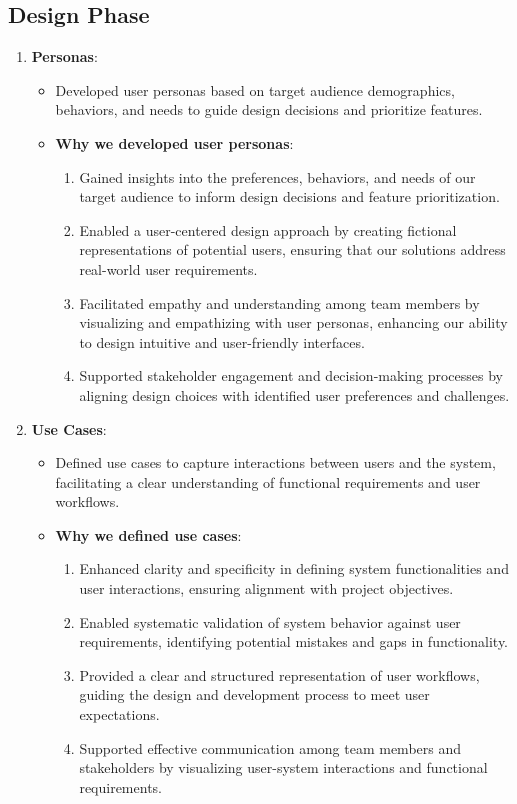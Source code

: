 \subsection{Design Phase}

\begin{enumerate}
    \item \textbf{Personas}:
    \begin{itemize}
        \item Developed user personas based on target audience demographics, behaviors, and needs to guide design decisions and prioritize features.
        \item \textbf{Why we developed user personas}:
            \begin{enumerate}
                \item Gained insights into the preferences, behaviors, and needs of our target audience to inform design decisions and feature prioritization.
                \item Enabled a user-centered design approach by creating fictional representations of potential users, ensuring that our solutions address real-world user requirements.
                \item Facilitated empathy and understanding among team members by visualizing and empathizing with user personas, enhancing our ability to design intuitive and user-friendly interfaces.
                \item Supported stakeholder engagement and decision-making processes by aligning design choices with identified user preferences and challenges.
            \end{enumerate}
    \end{itemize}

    
    \item \textbf{Use Cases}:
    \begin{itemize}
        \item Defined use cases to capture interactions between users and the system, facilitating a clear understanding of functional requirements and user workflows.
        \item \textbf{Why we defined use cases}:
            \begin{enumerate}
                \item Enhanced clarity and specificity in defining system functionalities and user interactions, ensuring alignment with project objectives.
                \item Enabled systematic validation of system behavior against user requirements, identifying potential mistakes and gaps in functionality.
                \item Provided a clear and structured representation of user workflows, guiding the design and development process to meet user expectations.
                \item Supported effective communication among team members and stakeholders by visualizing user-system interactions and functional requirements.
            \end{enumerate}
    \end{itemize}


\end{enumerate}
